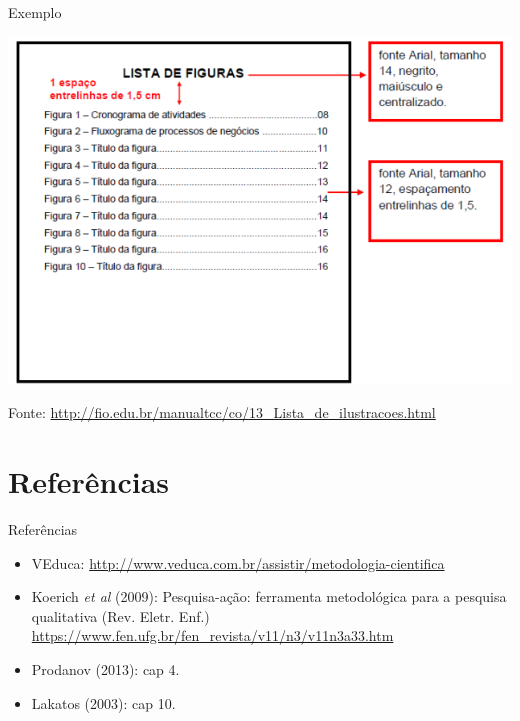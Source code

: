 \documentclass{beamer}
\begin{document}
\begin{frame}{Exemplo}
  \begin{center}
    \includegraphics[height=0.8\textheight]{ProjetoII/lista_figuras}
  \end{center}

  Fonte: \url{http://fio.edu.br/manualtcc/co/13_Lista_de_ilustracoes.html}
\end{frame}

\section{Referências}

\begin{frame}{Referências}
  \begin{itemize}
  \item<1-> VEduca:
    \url{http://www.veduca.com.br/assistir/metodologia-cientifica}
  \item<1-> Koerich {\em et al} (2009): Pesquisa-ação: ferramenta
    metodológica para a pesquisa qualitativa (Rev. Eletr. Enf.)
    \url{https://www.fen.ufg.br/fen_revista/v11/n3/v11n3a33.htm}
  \item<1-> Prodanov (2013): cap 4.
  \item<1-> Lakatos (2003): cap 10.
  \end{itemize}
\end{frame}
\end{document}
